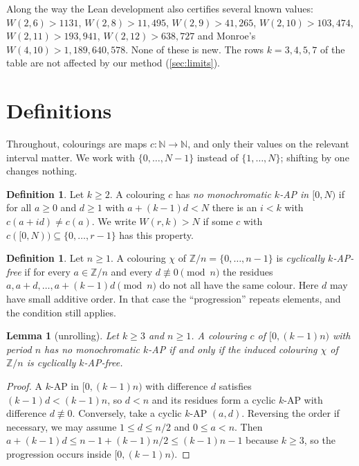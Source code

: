 \documentclass[11pt]{article}
\numberwithin{equation}{section}
\newtheorem{lemma}[theorem]{Lemma}
\theoremstyle{definition}
\newtheorem{definition}[theorem]{Definition}
\theoremstyle{remark}
\newcommand{\Z}{\mathbb Z}
\newcommand{\N}{\mathbb N}
\newcommand{\W}{W}
\begin{document}
Along the way the Lean development also certifies several known values:
$\W(2,6)>1131$, $\W(2,8)>11{,}495$, $\W(2,9)>41{,}265$, $\W(2,10)>103{,}474$,
$\W(2,11)>193{,}941$, $\W(2,12)>638{,}727$ and Monroe's $\W(4,10)>1{,}189{,}640{,}578$.
None of these is new.  The rows $k=3,4,5,7$ of the table are not affected by our method
(\cref{sec:limits}).

\section{Definitions}\label{sec:defs}

Throughout, colourings are maps $c:\N\to\N$, and only their values on the relevant interval
matter.  We work with $\{0,\dots,N-1\}$ instead of $\{1,\dots,N\}$; shifting by one changes
nothing.

\begin{definition}
Let $k\ge2$.  A colouring $c$ has \emph{no monochromatic $k$-AP in $[0,N)$} if for all $a\ge0$
and $d\ge1$ with $a+(k-1)d<N$ there is an $i<k$ with $c(a+id)\neq c(a)$.  We write
$\W(r,k)>N$ if some $c$ with $c([0,N))\subseteq\{0,\dots,r-1\}$ has this property.
\end{definition}

\begin{definition}
Let $n\ge1$.  A colouring $\chi$ of $\Z/n=\{0,\dots,n-1\}$ is \emph{cyclically $k$-AP-free} if for
every $a\in\Z/n$ and every $d\not\equiv0\pmod n$ the residues $a,a+d,\dots,a+(k-1)d \pmod n$ do
not all have the same colour.  Here $d$ may have small additive order.  In that case the
``progression'' repeats elements, and the condition still applies.
\end{definition}

\begin{lemma}[unrolling]\label{lem:unroll}
Let $k\ge3$ and $n\ge1$.  A colouring $c$ of $[0,(k-1)n)$ with period $n$ has no monochromatic
$k$-AP if and only if the induced colouring $\chi$ of $\Z/n$ is cyclically $k$-AP-free.
\end{lemma}

\begin{proof}
A $k$-AP in $[0,(k-1)n)$ with difference $d$ satisfies $(k-1)d<(k-1)n$, so $d<n$ and its
residues form a cyclic $k$-AP with difference $d\not\equiv 0$.  Conversely, take a cyclic
$k$-AP $(a,d)$.  Reversing the order if necessary, we may assume $1\le d\le n/2$ and
$0\le a<n$.  Then $a+(k-1)d\le n-1+(k-1)n/2\le (k-1)n-1$ because $k\ge3$, so the progression
occurs inside $[0,(k-1)n)$.
\end{proof}
\end{document}
